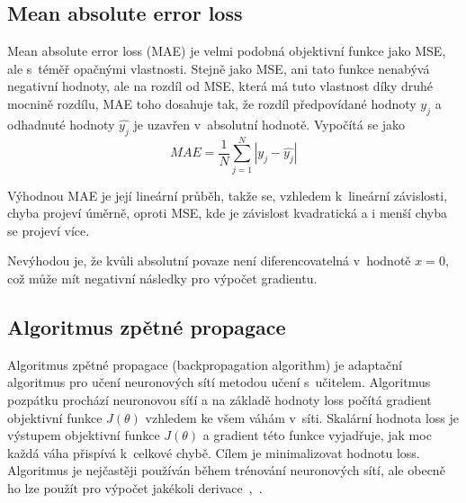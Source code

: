 

\subsection*{Mean absolute error loss}
Mean absolute error loss (MAE) je velmi podobná objektivní funkce jako MSE, ale s~téměř opačnými vlastnosti. Stejně jako MSE, ani tato funkce nenabývá negativní hodnoty, ale na rozdíl od MSE, která má tuto vlastnost díky druhé mocnině rozdílu, MAE toho dosahuje tak, že rozdíl předpovídané hodnoty $y_j$ a odhadnuté hodnoty $\hat{y_j}$ je uzavřen v~absolutní hodnotě. Vypočítá se jako
\begin{equation}
  MAE = \frac{1}{N}\sum_{j=1}^N|y_j - \hat{y_j}|
\end{equation}

Výhodnou MAE je její lineární průběh, takže se, vzhledem k~lineární závislosti, chyba projeví úměrně, oproti MSE, kde je závislost kvadratická a i menší chyba se projeví více.

Nevýhodou je, že kvůli absolutní povaze není diferencovatelná v~hodnotě $x=0$, což může mít negativní následky pro výpočet gradientu.



\subsection{Algoritmus zpětné propagace}
Algoritmus zpětné propagace (backpropagation algorithm) je adaptační algoritmus pro učení neuronových sítí metodou učení s~učitelem. Algoritmus pozpátku prochází neuronovou síťí a na základě hodnoty loss počítá gradient objektivní funkce $J(\theta)$ vzhledem ke všem váhám v~síti. Skalární hodnota loss je výstupem objektivní funkce $J(\theta)$ a gradient této funkce vyjadřuje, jak moc každá váha přispívá k~celkové chybě. Cílem je minimalizovat hodnotu loss. Algoritmus je nejčastěji používán během trénování neuronových sítí, ale obecně ho lze použít pro výpočet jakékoli derivace~\cite{mitdeeplearning_small},~\cite{mitdeeplearning}.

